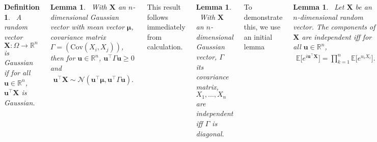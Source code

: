 \documentclass{tikzposter} %
\newtheorem{lemma}[theorem]{Lemma}
\newtheorem{definition}{Definition}
\begin{document}
\begin{columns}
{    \begin{definition}
    \ A random vector $\bm{X} : \Omega \to \mathbb{R}^{n}$ is Gaussian if for all $\bm{u} \in \mathbb{R}^{n}$, $\bm{u}^{\top}\bm{X}$ is Gaussian.
    \end{definition}
    \hphantom{}

    \begin{lemma}
    \ With $\bm{X}$ an $n$-dimensional Gaussian vector with mean vector $\bm{\mu}$, covariance matrix $\Gamma = (\mathrm{Cov}(X_{i},X_{j}))$, then for $\bm{u} \in \mathbb{R}^{n}$, $\bm{u}^{\top}\Gamma \bm{u} \ge 0$ and
    \begin{align*}
      \bm{u}^{\top}\bm{X} \sim \mathcal{N}(\bm{u}^{\top}\bm{\mu}, \bm{u}^{\top}\Gamma \bm{u}).
    \end{align*}
    \end{lemma}
    \hphantom{}

    This result follows immediately from calculation. \\

    \begin{lemma}
    \ With $\bm{X}$ an $n$-dimensional Gaussian vector, $\Gamma$ its covariance matrix, $X_{1},\dots,X_{n}$ are independent iff $\Gamma$ is diagonal.
    \end{lemma}
    \hphantom{}

    To demonstrate this, we use an initial lemma
    \begin{lemma}
    \ Let $\bm{X}$ be an $n$-dimensional random vector. The components of $\bm{X}$ are independent iff for all $\bm{u} \in \mathbb{R}^{n}$,
    \begin{align*}
      \mathbb{E}\big[e^{i \bm{u}^{\top}\bm{X}}\big] = \prod_{k=1}^{n} \mathbb{E}\big[e^{u_{i}X_{i}}\big].
    \end{align*}
    \end{lemma}
    \hphantom{}

    That $\bm{X}$'s components being independent implies this relation is clear from properties of the characteristic function. To demonstrate the reverse, we take $\widetilde{\bm{X}}$ such that $\widetilde{X}_{1}, \dots, \widetilde{X}_{n}$ are independent, and note that the characteristic functions of $\widetilde{\bm{X}}$ and $\bm{X}$ are the same. Thus by uniqueness of characteristic functions for $n$-dimensional variables, $\widetilde{\bm{X}}$ and $\bm{X}$ are identically distributed so the components of $\bm{X}$ are all independent. \\

    We can now see by evaluating the characteristic function of $\bm{X}$ a Gaussian vector that the above result holds.\\

}
\end{columns}
\end{document}
